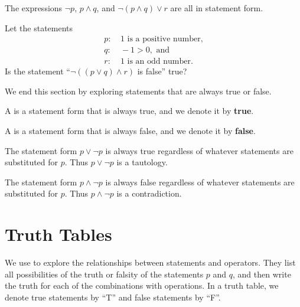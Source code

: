 \begin{example}
    The expressions $\lnot p$, $p \land q$, and $\lnot(p \land q) \lor r$ are all in statement form.
\end{example}

\begin{exercise}
    Let the statements
    \begin{align*}
        p: &\ \text{1 is a positive number},\\
        q: &\ -1 > 0, \text{ and}\\
        r: &\ \text{1 is an odd number}.
    \end{align*}
    Is the statement ``$\lnot((p\lor q)\land r)$ is false'' true?
\end{exercise}

We end this section by exploring statements that are always true or false.

\begin{definition}
    A  is a statement form that is always true, and we denote it by \textbf{true}.
\end{definition}

\begin{definition}
    A  is a statement form that is always false, and we denote it by \textbf{false}.
\end{definition}

\begin{example}
    The statement form $p \lor \lnot p$ is always true regardless of whatever statements are substituted for $p$. Thus $p \lor \lnot p$ is a tautology.
\end{example}

\begin{example}
    The statement form $p \land \lnot p$ is always false regardless of whatever statements are substituted for $p$. Thus $p \land \lnot p$ is a contradiction.
\end{example}

\section{Truth Tables}
We use  to explore the relationships between statements and operators. They list all possibilities of the truth or falsity of the statements $p$ and $q$, and then write the truth for each of the combinations with operations. In a truth table, we denote true statements by ``T'' and false statements by ``F''.

